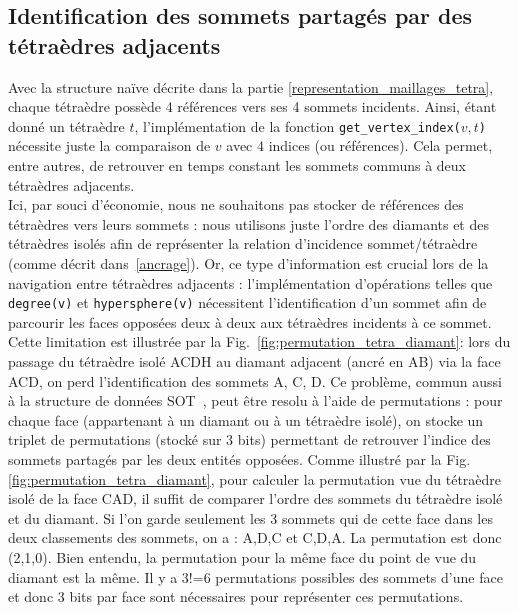 \subsection{Identification des sommets partagés par des tétraèdres adjacents}
\noindent
Avec la structure naïve décrite dans la partie \ref{representation_maillages_tetra}, chaque tétraèdre possède 4 références vers ses 4 sommets incidents. Ainsi, étant donné un tétraèdre $t$, l'implémentation de la fonction \texttt{get\_vertex\_index($v,t$)} nécessite juste la comparaison de $v$ avec $4$ indices (ou références).  Cela permet, entre autres, de retrouver en temps constant les sommets communs à deux tétraèdres adjacents.\\
Ici, par souci d'économie, nous ne souhaitons pas stocker de références des tétraèdres vers leurs sommets : nous utilisons juste l'ordre des diamants et des tétraèdres isolés afin de représenter la relation d'incidence sommet/tétraèdre (comme décrit dans~\ref{ancrage}).
Or, ce type d'information est crucial lors de la navigation entre tétraèdres adjacents : l'implémentation d'opérations telles que \texttt{degree(v)} et \texttt{hypersphere(v)} nécessitent l'identification d'un sommet afin de parcourir les faces opposées deux à deux aux tétraèdres incidents à ce sommet. 
%
Cette limitation est illustrée par la Fig.~\ref{fig:permutation_tetra_diamant}: lors du passage du tétraèdre isolé ACDH au diamant adjacent (ancré en AB) via la face ACD, on perd l'identification des sommets A, C, D.
Ce problème, commun aussi à la structure de données SOT~\cite{SOT}, peut \^etre resolu à l'aide de permutations : pour chaque face (appartenant à un diamant ou à un tétraèdre isolé), on stocke un triplet de permutations (stocké sur 3 bits) permettant de retrouver l'indice des sommets partagés par les deux entités opposées.
Comme illustré par la Fig. \ref{fig:permutation_tetra_diamant}, pour calculer la permutation vue du tétraèdre isolé de la face CAD, il suffit de comparer l'ordre des sommets du tétraèdre isolé et du diamant. Si l'on garde seulement les 3 sommets qui de cette face dans les deux classements des sommets, on a : A,D,C et C,D,A. La permutation est donc (2,1,0). Bien entendu, 
la permutation pour la même face du point de vue du diamant est la même. Il y a 3!=6 permutations possibles des sommets d'une face et donc 3 bits par face sont nécessaires pour représenter ces permutations.

